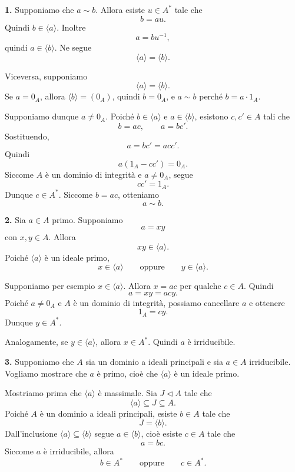 \documentclass[a4paper]{article}
\begin{document}
\begin{radioactive}
\begin{snippetproof}{}
    \textbf{1.}
    Supponiamo che \(a\sim b\). Allora esiste \(u\in A^\ast\) tale che
    \[
        b=au.
    \]
    Quindi \(b\in \langle a \rangle\). Inoltre
    \[
        a=bu^{-1},
    \]
    quindi \(a\in \langle b \rangle\). Ne segue
    \[
        \langle a \rangle=\langle b \rangle.
    \]

    Viceversa, supponiamo
    \[
        \langle a \rangle=\langle b \rangle.
    \]
    Se \(a=0_A\), allora \(\langle b \rangle=(0_A)\), quindi \(b=0_A\), e \(a\sim b\) perché \(b=a\cdot 1_A\).

    Supponiamo dunque \(a\neq 0_A\). Poiché \(b\in\langle a \rangle\) e \(a\in\langle b \rangle\), esistono \(c,c'\in A\) tali che
    \[
        b=ac,
        \qquad
        a=bc'.
    \]
    Sostituendo,
    \[
        a=bc'=acc'.
    \]
    Quindi
    \[
        a(1_A-cc')=0_A.
    \]
    Siccome \(A\) è un dominio di integrità e \(a\neq 0_A\), segue
    \[
        cc'=1_A.
    \]
    Dunque \(c\in A^\ast\). Siccome \(b=ac\), otteniamo
    \[
        a\sim b.
    \]

    \textbf{2.}
    Sia \(a\in A\) primo. Supponiamo
    \[
        a=xy
    \]
    con \(x,y\in A\). Allora
    \[
        xy\in\langle a \rangle.
    \]
    Poiché \(\langle a \rangle\) è un ideale primo,
    \[
        x\in\langle a \rangle
        \qquad
        \text{oppure}
        \qquad
        y\in\langle a \rangle.
    \]

    Supponiamo per esempio \(x\in\langle a \rangle\). Allora \(x=ac\) per qualche \(c\in A\). Quindi
    \[
        a=xy=acy.
    \]
    Poiché \(a\neq 0_A\) e \(A\) è un dominio di integrità, possiamo cancellare \(a\) e ottenere
    \[
        1_A=cy.
    \]
    Dunque \(y\in A^\ast\).

    Analogamente, se \(y\in\langle a \rangle\), allora \(x\in A^\ast\).
    Quindi \(a\) è irriducibile.

    \textbf{3.}
    Supponiamo che \(A\) sia un dominio a ideali principali e sia \(a\in A\) irriducibile.
    Vogliamo mostrare che \(a\) è primo, cioè che \(\langle a \rangle\) è un ideale primo.

    Mostriamo prima che \(\langle a \rangle\) è massimale. Sia \(J\triangleleft A\) tale che
    \[
        \langle a \rangle\subseteq J\subseteq A.
    \]
    Poiché \(A\) è un dominio a ideali principali, esiste \(b\in A\) tale che
    \[
        J=\langle b \rangle.
    \]
    Dall'inclusione \(\langle a \rangle\subseteq\langle b \rangle\) segue \(a\in\langle b \rangle\), cioè esiste \(c\in A\) tale che
    \[
        a=bc.
    \]
    Siccome \(a\) è irriducibile, allora
    \[
        b\in A^\ast
        \qquad
        \text{oppure}
        \qquad
        c\in A^\ast.
    \]


\end{snippetproof}
\end{radioactive}
\end{document}
